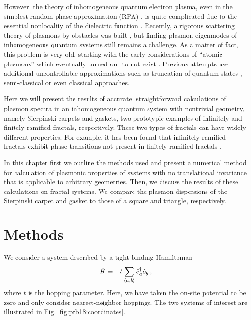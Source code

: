 However, the theory of inhomogeneous quantum electron plasma, even in the simplest random-phase approximation (RPA) \cite{nozieres1999theory, platzman1973waves,Vonsov2012QuantumSolidS, giuliani2005quantum}, is quite complicated due to the essential nonlocality of the dielectric function \cite{Vonsov2012QuantumSolidS}. Recently, a rigorous scattering theory of plasmons by obstacles was built \cite{torre2017lippmann}, but finding plasmon eigenmodes of inhomogeneous quantum systems still remains a challenge.  As a matter of fact, this problem is very old, starting with the early considerations \cite{bloch1933bremsvermogen, jensen1937eigenschwingungen} of ``atomic plasmons'' \cite{kh1971ishmukhametov, sen1973spectrum, gadiyak1975collective, ishmukhametov1975collective, amusia1978existence} which eventually turned out to not exist \cite{verkhovtseva1976concerning, ishmukhametov1981existence}. Previous attempts use additional uncontrollable approximations such as truncation of quantum states \cite{amusia1978existence}, semi-classical \cite{kh1971ishmukhametov, ishmukhametov1975collective, ishmukhametov1981existence} or even classical \cite{gadiyak1975collective} approaches.

Here we will present the results of accurate, straightforward calculations of plasmon spectra in an inhomogeneous quantum system with nontrivial geometry, namely Sierpinski carpets and gaskets, two prototypic examples of infinitely and finitely ramified fractals, respectively. These two types of fractals can have widely different properties. For example, it has been found that infinitely ramified fractals exhibit phase transitions not present in finitely ramified fractals \cite{gefen1984phase}.

In this chapter first we outline the methods used and present a numerical method for calculation of plasmonic properties of systems with no translational invariance that is applicable to arbitrary geometries. Then, we discuss the results of these calculations on fractal systems. We compare the plasmon dispersions of the Sierpinski carpet and gasket to those of a square and triangle, respectively.

\section{Methods}

We consider a system described by a tight-binding Hamiltonian
\begin{equation} \label{eq:hamiltonian}
    \hat H = - t \sum_{\langle a,b \rangle} \hat c^{\dagger}_{a \vphantom{b}}
    \hat c^{\vphantom{\dagger}}_b \;,
\end{equation}
where $t$ is the hopping parameter. Here, we have taken the on-site potential to be zero and only consider nearest-neighbor hoppings. The two systems of interest are illustrated in Fig. \ref{fig:prb18:coordinates}.

